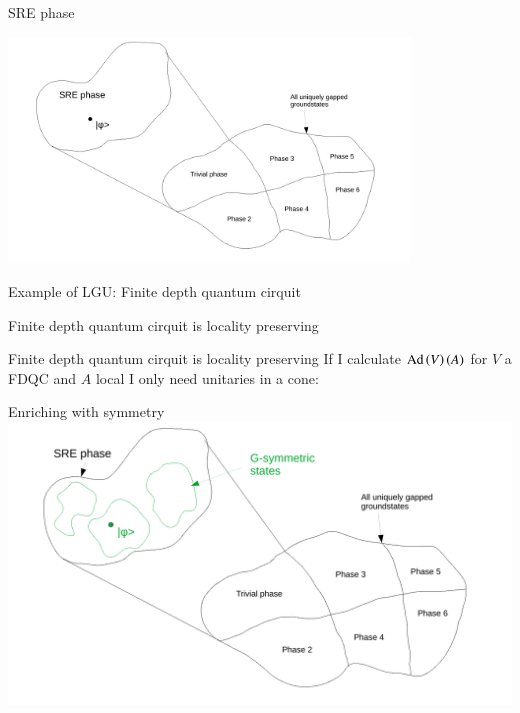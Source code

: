 \documentclass{beamer}
\begin{document}
\begin{frame}{SRE phase}
	\begin{center}
		\includegraphics[trim={1.5cm 0 2cm 0},clip,width=0.8\textwidth]{Figures/SRE_Phase.pdf}
	\end{center}
\end{frame}

\begin{frame}{Example of LGU: Finite depth quantum cirquit}
	\begin{center}
		
	\end{center}
\end{frame}

\begin{frame}{Finite depth quantum cirquit is locality preserving}
	\begin{center}
		\scalebox{0.75}{}
	\end{center}
	\pause
	\begin{center}
		\scalebox{0.75}{}
	\end{center}
\end{frame}

\begin{frame}{Finite depth quantum cirquit is locality preserving}
	If I calculate $\textrm{Ad}\left(V\right)(A)$ for $V$ a FDQC and $A$ local I only need unitaries in a cone:
	\begin{center}
		\scalebox{0.75}{
			
		}
	\end{center}
\end{frame}

\begin{frame}{Enriching with symmetry}
	\includegraphics[width=\textwidth]{Figures/G-invariant_Parts_Of_SRE_Phase.pdf}
\end{frame}
\end{document}
